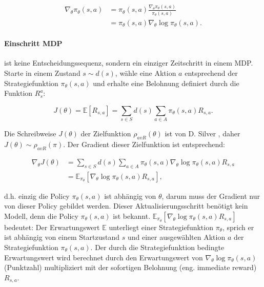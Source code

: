 \documentclass[conference]{IEEEtran}
\begin{document}
\begin{equation*}
\begin{aligned}
\nabla_\theta \pi_\theta (s,a) & = \pi_\theta (s,a) \frac{\nabla_\theta \pi_\theta (s,a)}{\pi_\theta (s,a)} \\
& = \pi_\theta (s,a) \nabla_\theta \log \pi_\theta (s,a).
\end{aligned}
\end{equation*}

\paragraph*{Einschritt MDP} ist keine Entscheidungssequenz, sondern ein einziger Zeitschritt in einem MDP. Starte in einem Zustand $s \sim d(s)$, wähle eine Aktion $a$ entsprechend der Strategiefunktion $\pi_\theta(s,a)$ und erhalte eine Belohnung definiert durch die Funktion $R^a_s$:

\begin{equation*}
J(\theta) = \mathbb{E}[R_{s,a}] = \sum_{s \in S} d(s) \sum_{a \in A} \pi_\theta(s,a) R_{s,a}.
\end{equation*}

Die Schreibweise $J(\theta)$ der Zielfunktion $\rho_{avR}(\theta)$ ist von D. Silver \cite{silver_15}, daher $J(\theta) \sim \rho_{avR}(\pi)$. Der Gradient dieser Zielfunktion ist entsprechend:

\begin{equation*}
\begin{aligned}
\nabla_\theta J(\theta) & = \sum_{s \in S} d(s) \sum_{a \in A} \pi_\theta(s,a) \nabla_\theta \log \pi_\theta(s,a) R_{s,a} \\
& = \mathbb{E}_{\pi_\theta}[\nabla_\theta \log \pi_\theta(s,a) R_{s,a}],
\end{aligned}
\end{equation*}

d.h. einzig die Policy $\pi_\theta(s,a)$ ist abhängig von $\theta$, darum muss der Gradient nur von dieser Policy gebildet werden. Dieser Aktualisierungsschritt benötigt kein Modell, denn die Policy $\pi_\theta(s,a)$ ist bekannt. $\mathbb{E}_{\pi_\theta}[\nabla_\theta \log \pi_\theta(s,a) R_{s,a}]$ bedeutet: Der Erwartungswert $\mathbb{E}$ unterliegt einer Strategiefunktion $\pi_\theta$, sprich er ist abhängig von einem Startzustand $s$ und einer ausgewählten Aktion $a$ der Strategiefunktion $\pi_\theta(s,a)$. Der durch die Strategiefunktion bedingte Erwartungswert wird berechnet durch den Erwartungswert von $\nabla_\theta \log \pi_\theta(s,a)$ (Punktzahl) multipliziert mit der sofortigen Belohnung (eng. immediate reward) $R_{s,a}$. 
\end{document}
